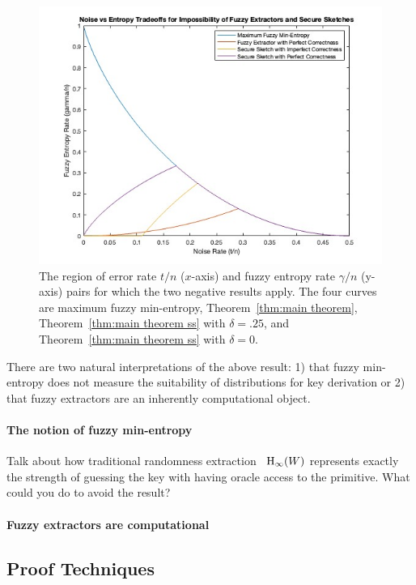 \begin{figure}[t]
\centering
\includegraphics[width=.8\textwidth]{EntropyvsError.jpg}
\caption{The region of error rate $t/n$ ($x$-axis) and fuzzy entropy rate $\gamma/n$ (y-axis) pairs for which the two negative results apply.  The four curves are maximum fuzzy min-entropy, Theorem~\ref{thm:main theorem}, Theorem~\ref{thm:main theorem ss} with $\delta=.25$, and Theorem~\ref{thm:main theorem ss} with $\delta =0$.}
\label{fig:param regime}
\end{figure}

There are two natural interpretations of the above result: 1) that fuzzy min-entropy does not measure the suitability of distributions for key derivation or 2) that fuzzy extractors are an inherently computational object.

\paragraph{The notion of fuzzy min-entropy}
Talk about how traditional randomness extraction~\cite{nisan1993randomness} $\mathrm{H}_\infty(W)$ represents exactly the strength of guessing the key with having oracle access to the primitive. What could you do to avoid the result?

\paragraph{Fuzzy extractors are computational}

\subsection{Proof Techniques}
